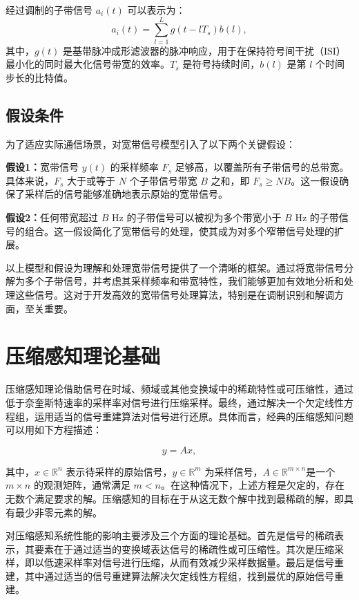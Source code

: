 经过调制的子带信号 \( a_i(t) \) 可以表示为：
\begin{equation}
    a_i(t)=\sum_{l=1}^L g(t-lT_s)b(l),
\end{equation}
其中，\( g(t) \) 是基带脉冲成形滤波器的脉冲响应，用于在保持符号间干扰（ISI）最小化的同时最大化信号带宽的效率。\( T_s \) 是符号持续时间，\( b(l) \) 是第 \( l \) 个时间步长的比特值。

\subsection{假设条件}\label{sec:assumptions}
为了适应实际通信场景，对宽带信号模型引入了以下两个关键假设：

\textbf{假设1：}宽带信号 \( y(t) \) 的采样频率 \( F_s \) 足够高，以覆盖所有子带信号的总带宽。具体来说，\( F_s \) 大于或等于 \( N \) 个子带信号带宽 \( B \) 之和，即 \( F_s \geq NB \)。这一假设确保了采样后的信号能够准确地表示原始的宽带信号。

\textbf{假设2：}任何带宽超过 \( B \) Hz 的子带信号可以被视为多个带宽小于 \( B \) Hz 的子带信号的组合。这一假设简化了宽带信号的处理，使其成为对多个窄带信号处理的扩展。

以上模型和假设为理解和处理宽带信号提供了一个清晰的框架。通过将宽带信号分解为多个子带信号，并考虑其采样频率和带宽特性，我们能够更加有效地分析和处理这些信号。这对于开发高效的宽带信号处理算法，特别是在调制识别和解调方面，至关重要。



\section{压缩感知理论基础}\label{sec:background}

压缩感知理论借助信号在时域、频域或其他变换域中的稀疏特性或可压缩性，通过低于奈奎斯特速率的采样率对信号进行压缩采样。最终，通过解决一个欠定线性方程组，运用适当的信号重建算法对信号进行还原。具体而言，经典的压缩感知问题可以用如下方程描述：

\begin{equation}
    y=Ax,
\end{equation}

其中，$x \in \mathbb{R}^n$ 表示待采样的原始信号，$y \in \mathbb{R}^m$ 为采样信号，$A \in \mathbb{R}^{m \times n}$是一个 $m \times n$ 的观测矩阵，通常满足 $m < n$。在这种情况下，上述方程是欠定的，存在无数个满足要求的解。压缩感知的目标在于从这无数个解中找到最稀疏的解，即具有最少非零元素的解。

对压缩感知系统性能的影响主要涉及三个方面的理论基础。首先是信号的稀疏表示，其要素在于通过适当的变换域表达信号的稀疏性或可压缩性。其次是压缩采样，即以低速采样率对信号进行压缩，从而有效减少采样数据量。最后是信号重建，其中通过适当的信号重建算法解决欠定线性方程组，找到最优的原始信号重建。

